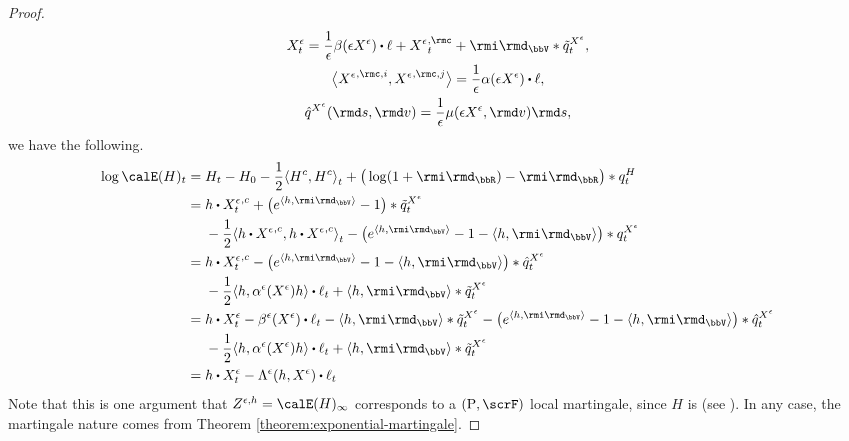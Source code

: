 \begin{proof}
  \begin{gather*}
    \Xee_t = \frac1\epsilon \affDrift(\Xe) \shortInt \leb + {\Xee}^{,\rmc}_t + \id_\vecSpace \ast \compensate{\jumpMeas^{\Xee}}_t,  \\
    \bprj{{\Xee}^{,\rmc,i}}{{\Xee}^{,\rmc,j}} = \frac1\epsilon\affDiff(\Xe) \shortInt \leb, \\
    \predproj{\jumpMeas^{\Xee}}(\rmd s, \rmd\markVar) = \frac1\epsilon \affJump(\Xe, \rmd\markVar) \rmd s,
  \end{gather*}
  we have the following.
  \begin{align*}
    \log\calE(H)_t
    &= H_t - H_0 - \frac12 \prj{H^c}{H^c}_t + \big( \log(1+\id_\bbR) - \id_\bbR \big) \ast \jumpMeas^H_t \\
    &=\begin{aligned}[t]
      &\twistFunc \shortInt {\Xee_t}^{,c} + \big( e^\prj{\twistFunc}{\id_\vecSpace} - 1 \big) \ast \compensate{\jumpMeas^{\Xee}}_t \\
      &- \frac12 \prj{\twistFunc \shortInt {\Xee}^{,c}}{\twistFunc \shortInt {\Xee}^{,c}}_t - \big( e^\prj{\twistFunc}{\id_\vecSpace} - 1 -\prj{\twistFunc}{\id_\vecSpace}\big) \ast \jumpMeas^{\Xee}_t
    \end{aligned} \\
    &=\begin{aligned}[t]
      &\twistFunc \shortInt {\Xee_t}^{,c} - \big( e^\prj{\twistFunc}{\id_\vecSpace} - 1  - \prj{\twistFunc}{\id_\vecSpace}\big) \ast \predproj{\jumpMeas^{\Xee}}_t \\
      &- \frac12 \prj{\twistFunc}{\affDiff^\epsilon(\Xee)\twistFunc} \shortInt \leb_t + \prj{\twistFunc}{\id_\vecSpace} \ast \compensate{\jumpMeas^{\Xee}}_t
    \end{aligned} \\
    &=\begin{aligned}[t]
      &\twistFunc \shortInt \Xee_t - \affDrift^\epsilon(\Xee) \shortInt \leb_t - \prj{\twistFunc}{\id_\vecSpace} \ast \compensate{\jumpMeas^{\Xee}}_t - \big( e^\prj{\twistFunc}{\id_\vecSpace} - 1  - \prj{\twistFunc}{\id_\vecSpace}\big) \ast \predproj{\jumpMeas^{\Xee}}_t \\
      &- \frac12 \prj{\twistFunc}{\affDiff^\epsilon(\Xee)\twistFunc} \shortInt \leb_t + \prj{\twistFunc}{\id_\vecSpace} \ast \compensate{\jumpMeas^{\Xee}}_t
    \end{aligned} \\
    &= \twistFunc \shortInt \Xee_t - \ode^\epsilon(\twistFunc, \Xee) \shortInt \leb_t
  \end{align*}
  Note that this is one argument that $\mgDensity^{\epsilon,\twistFunc} = \calE(H)_\infty$ corresponds to a $(\Prb, \scrF)$ local martingale, since $H$ is (see \cite[Theorem I.4.61(b)]{jacod2003}).
  In any case, the martingale nature comes from Theorem \ref{theorem:exponential-martingale}.
\end{proof}
